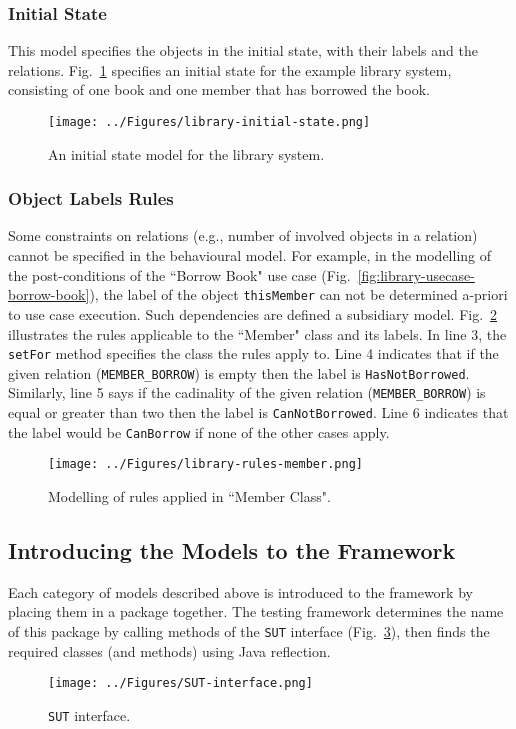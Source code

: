 \subsubsection{Initial State}
\label{sec:subsidiary-models-initial-state}
This model specifies the objects in the initial state, with their labels and the relations. Fig.~\ref{fig:library-initial-state} specifies an initial state for the example library system, consisting of one book and one member that has borrowed the book.

\begin{figure}[h]
\centering
\texttt{[image: ../Figures/library-initial-state.png]}
\caption{An initial state model for the library system.}
\label{fig:library-initial-state}
\end{figure}

\subsubsection{Object Labels Rules}
\label{sec:subsidiary-models-object-labels}
Some constraints on relations (e.g., number of involved objects in a relation) cannot be specified in the behavioural model. For example, in the modelling of the post-conditions of the ``Borrow Book" use case (Fig.~\ref{fig:library-usecase-borrow-book}), the label of the object \texttt{thisMember} can not be determined a-priori to use case execution. 
Such dependencies are defined a subsidiary model. Fig.~\ref{fig:library-rules-member} illustrates the rules applicable to the ``Member" class and its labels. In line 3, the \texttt{setFor} method specifies the class the rules apply to. Line 4 indicates that if the given relation (\texttt{MEMBER\_BORROW}) is empty then the label is \texttt{HasNotBorrowed}. Similarly, line 5 says if the cadinality of the given relation (\texttt{MEMBER\_BORROW}) is equal or greater than two then the label is \texttt{CanNotBorrowed}. Line 6 indicates that the label would be \texttt{CanBorrow} if none of the other cases apply.

\begin{figure}[h]
\centering
\texttt{[image: ../Figures/library-rules-member.png]}
\caption{Modelling of rules applied in ``Member Class".}
\label{fig:library-rules-member}
\end{figure}

\subsection{Introducing the Models to the Framework}
\label{sec:create-test model-introducing-models}
Each category of models described above is introduced to the framework by placing them in a package together.
The testing framework determines the name of this package by calling methods of the \texttt{SUT} interface (Fig.~\ref{fig:SUT-interface}), then finds the required classes (and methods) using Java reflection.

\begin{figure}[h]
\centering
\texttt{[image: ../Figures/SUT-interface.png]}
\caption{\texttt{SUT} interface.}
\label{fig:SUT-interface}
\end{figure}
